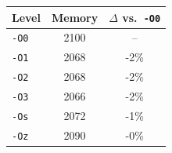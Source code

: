 \begin{tabular*}{\columnwidth}{@{\extracolsep\fill}lcc@{\extracolsep\fill}}
\toprule
\textbf{Level} & \textbf{Memory} & \textbf{$\Delta$ vs.\ \texttt{-O0}} \\
\midrule
\texttt{-O0} & 2100 & -- \\
\texttt{-O1} & 2068 & -2\% \\
\texttt{-O2} & 2068 & -2\% \\
\texttt{-O3} & 2066 & -2\% \\
\texttt{-Os} & 2072 & -1\% \\
\texttt{-Oz} & 2090 & -0\% \\
\bottomrule
\end{tabular*}
